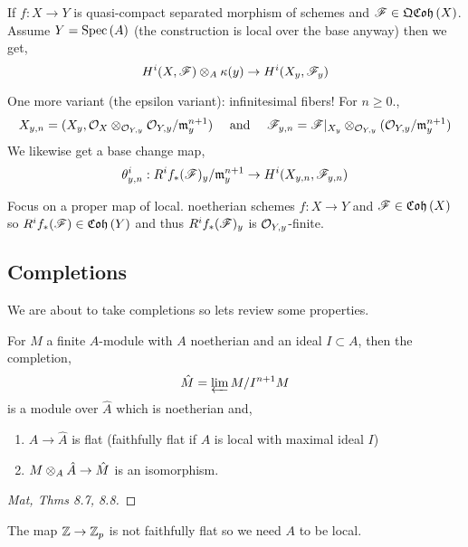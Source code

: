 \documentclass[12pt]{article}
\begin{document}
\begin{example}
If $f : X \to Y$ is quasi-compact separated morphism of schemes and $\mathscr{F} \in \mathfrak{QCoh}\left(X\right)$. Assume $Y = \mathrm{Spec}\left( A \right)$ (the construction is local over the base anyway) then we get,
\[ H^i(X, \mathscr{F}) \otimes_A \kappa(y) \to H^i(X_y, \mathscr{F}_y) \]
\end{example}

\begin{rmk}
One more variant (the epsilon variant): infinitesimal fibers! For $n \ge 0$.,
\[ X_{y,n} = (X_y, \mathcal{O}_{X} \otimes_{\mathcal{O}_{Y, y}} \mathcal{O}_{Y, y} / \mathfrak{m}_y^{n+1}) \quad \text{ and } \quad \mathscr{F}_{y, n} = \mathscr{F}|_{X_y} \otimes_{\mathcal{O}_{Y, y}} (\mathcal{O}_{Y, y}/\mathfrak{m}_y^{n+1}) \]
We likewise get a base change map,
\[ \theta^i_{y,n} : R^i f_* (\mathscr{F})_y / \mathfrak{m}_y^{n+1} \to H^i(X_{y,n}, \mathscr{F}_{y,n}) \]
\end{rmk}

\begin{rmk}
Focus on a proper map of local. noetherian schemes $f : X \to Y$ and $\mathscr{F} \in \mathfrak{Coh}\left(X\right)$ so $R^i f_*(\mathscr{F}) \in \mathfrak{Coh}\left(Y\right)$ and thus $R^i f_* (\mathscr{F})_y$ is $\mathcal{O}_{Y, y}$-finite. 
\end{rmk}

\subsection{Completions}

\begin{rmk}
We are about to take completions so lets review some properties.
\end{rmk}

\begin{prop}
For $M$ a finite $A$-module with $A$ noetherian and an ideal $I \subset A$, then the completion,
\[ \hat{M} = \varprojlim M / I^{n+1} M \]
is a module over $\hat{A}$ which is noetherian and,
\begin{enumerate}
\item $A \to \hat{A}$ is flat (faithfully flat if $A$ is local with maximal ideal $I$)
\item $M \otimes_A \hat{A} \to \hat{M}$ is an isomorphism.
\end{enumerate}
\end{prop}

\begin{proof}
[Mat, Thms 8.7, 8.8]
\end{proof}

\begin{rmk}
The map $\mathbb{Z} \to \mathbb{Z}_p$ is not faithfully flat so we need $A$ to be local. 
\end{rmk}
\end{document}
